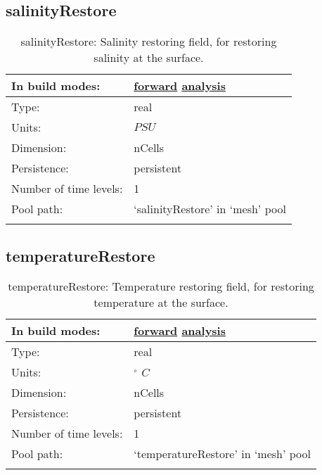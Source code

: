 \subsection[salinityRestore]{salinityRestore}
\label{subsec:var_sec_mesh_salinityRestore}
\begin{center}
\begin{longtable}{| p{2.0in} | p{4.0in} |}
        \hline 
        In build modes: & \hyperref[subsec:forward_var_tab_mesh]{forward} \hyperref[subsec:analysis_var_tab_mesh]{analysis} \\
        \hline 
        Type: & real \\
        \hline 
        Units: & $PSU$ \\
        \hline 
        Dimension: & nCells \\
        \hline 
        Persistence: & persistent \\
        \hline 
        Number of time levels: & 1 \\
        \hline 
            Pool path: & `salinityRestore' in `mesh' pool \\
		 \hline 
    \caption{salinityRestore: Salinity restoring field, for restoring salinity at the surface.}
\end{longtable}
\end{center}
\subsection[temperatureRestore]{temperatureRestore}
\label{subsec:var_sec_mesh_temperatureRestore}
\begin{center}
\begin{longtable}{| p{2.0in} | p{4.0in} |}
        \hline 
        In build modes: & \hyperref[subsec:forward_var_tab_mesh]{forward} \hyperref[subsec:analysis_var_tab_mesh]{analysis} \\
        \hline 
        Type: & real \\
        \hline 
        Units: & $^\circ$ $C$ \\
        \hline 
        Dimension: & nCells \\
        \hline 
        Persistence: & persistent \\
        \hline 
        Number of time levels: & 1 \\
        \hline 
            Pool path: & `temperatureRestore' in `mesh' pool \\
		 \hline 
    \caption{temperatureRestore: Temperature restoring field, for restoring temperature at the surface.}
\end{longtable}
\end{center}
